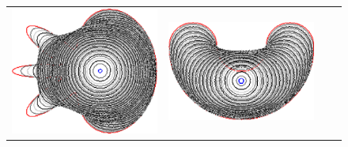 {\begin{figure}
\begin{tabular}{p{3em}ccc}
\includegraphics[scale=0.25]{figures/chapter6/level-effect/flower/improve/len_pen0/radius-5/level3/summary.pdf} &
\includegraphics[scale=0.25]{figures/chapter6/level-effect/bean/improve/len_pen0/radius-5/level3/summary.pdf} \\[2em]

\end{tabular}
\end{figure}}

